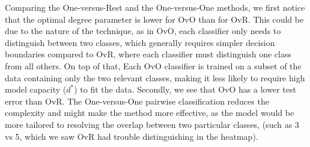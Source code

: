 \documentclass[final,3p,times,12pt]{article}
\begin{document}
Comparing the One-versus-Rest and the One-versus-One methods, we first notice that the optimal degree parameter is lower for OvO than for OvR. This could be due to the nature of the technique, as in OvO, each classifier only needs to distinguish between two classes, which generally requires simpler decision boundaries compared to OvR, where each classifier must distinguish one class from all others. On top of that, Each OvO classifier is trained on a subset of the data containing only the two relevant classes, making it less likely to require high model capacity ($d^*$) to fit the data. Secondly, we see that OvO has a lower test error than OvR. The One-versus-One pairwise classification reduces the complexity and might make the method more effective, as the model would be more tailored to resolving the overlap between two particular classes, (such as 3 vs 5, which we saw OvR had trouble distinguishing in the heatmap). 
\end{document}
